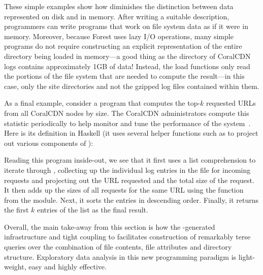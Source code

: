 These simple examples show how \forest{} diminishes the distinction
between data represented on disk and in memory. After writing a
suitable \forest{} description, programmers can write programs that
work on file system data as if it were in memory. Moreover, because
Forest uses lazy I/O operations, many simple programs do not require
constructing an explicit representation of the entire directory being
loaded in memory---a good thing as the directory of CoralCDN logs
contains approximately 1GB of data!  Instead, the load functions only
read the portions of the file system that are needed to compute the
result---in this case, only the site directories and not the gzipped
log files contained within them.

As a final example, consider a program that computes the top-$k$
requested URLs from all CoralCDN nodes by size. The CoralCDN
administrators compute this statistic periodically to help monitor and
tune the performance of the system~\cite{freedman:coral-experience}. 
Here is its definition in Haskell (it uses several helper
functions such as  to project out various components of
):
%
Reading this program inside-out, we see that it first uses a list
comprehension to iterate through , collecting up the
individual log entries in the  file for
incoming requests and projecting out the URL requested and the total
size of the request. It then adds up the sizes of all requests for the
same URL using the  function from the 
module. Next, it sorts the entries in descending order. Finally, it
returns the first $k$ entries of the list as the final result.

Overall, the main take-away from this section is how 
the \forest{}-generated infrastructure and tight coupling
to \haskell{} facilitates construction
of remarkably terse queries over the combination of file contents,
file attributes and directory structure.  Exploratory data analysis
in this new programming paradigm is light-weight, easy and highly effective.
